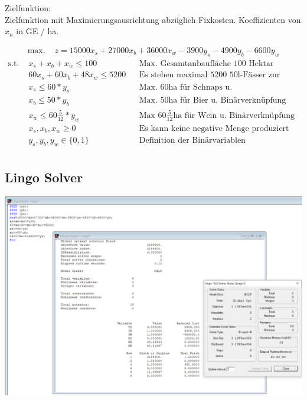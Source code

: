 \documentclass[a4paper,11pt]{article}
\begin{document}
\bigbreak
Zielfunktion: \\
Zielfunktion mit Maximierungsausrichtung abzüglich Fixkosten. Koeffizienten von $x_n$ in GE / ha.

\begin{align*}
    \text{max. } & z = 15000x_{s} + 27000x_{b} + 36000x_{w} - 3900y_{s} - 4900y_{b} - 6600y_{w}
\end{align*}
\begin{align*}
    \text{s.t. } & x_{s} + x_{b} + x_{w} \le 100 && \text{Max. Gesamtanbaufläche 100 Hektar} \\
    & 60x_{s} + 60x_{b} + 48x_{w} \le 5200 && \text{Es stehen maximal 5200 50l-Fässer zur Verfügung} \\
    & x_{s} \le 60*y_{s} && \text{Max. 60ha für Schnaps u. Binärverknüpfung} \\
    & x_{b} \le 50*y_{b} && \text{Max. 50ha für Bier u. Binärverknüpfung} \\
    & x_{w} \le 60\frac{5}{12}*y_{w} && \text{Max $60\frac{5}{12}$ha für Wein u. Binärverknüpfung} \\
    & x_{s}, x_{b}, x_{w} \ge 0 && \text{Es kann keine negative Menge produziert werden} \\
    & y_{s}, y_{b}, y_{w} \in \{ 0,1 \} && \text{Definition der Binärvariablen} \\
\end{align*}

\subsection*{Lingo Solver}
\begin{centering}
	\includegraphics[width=1\linewidth]{src/blatt_4_aufgabe_1_loesung_solver.PNG}
\end{centering}
\end{document}
